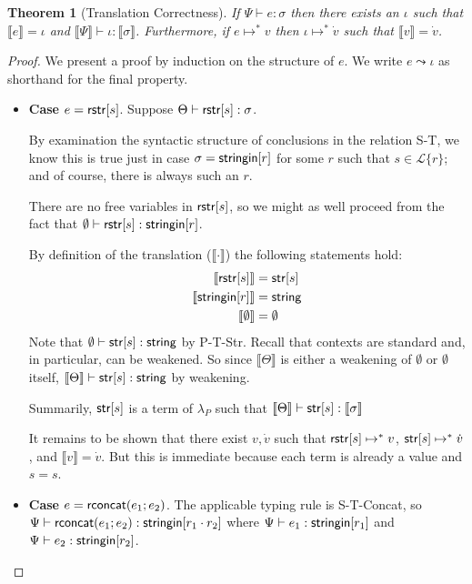 \documentclass[11pt,leqno]{article}
\newtheorem{thm}{Theorem}
\theoremstyle{definition}
\newcommand{\Lagr}{\mathcal{L}}
\newcommand{\lang}[1]{\Lagr\{#1\}}
\newcommand{\lambdap}{\lambda_P}
\newcommand{\stringin}[1]{{\sf stringin}[#1]}
\renewcommand{\tstr}[1]{{{\sf str}[#1]}}
\newcommand{\str}{{\sf string}}
\newcommand{\sctx}{\Psi} %
\newcommand{\tctx}{\Theta} %
\newcommand{\trden}[1]{\llbracket #1 \rrbracket} %
\begin{document}
\begin{thm}[Translation Correctness]\label{thm:trcorrect}
  If $\sctx \vdash e : \sigma$ then 
  there exists an $\iota$ such that $\trden{e} = \iota$
  and $\trden{\sctx} \vdash \iota : \trden{\sigma}$.
  Furthermore, if $e \mapsto^* v$ then
  $\iota \mapsto^* \dot{v}$ such that
  $\trden{v} = \dot{v}$.
\end{thm}
\begin{proof}
We present a proof by induction on the structure of $e$.
We write $e \leadsto \iota$ as shorthand for the final property.

\begin{itemize}[label=$ $, itemsep=1ex]
\item \textbf{Case $e = {\sf rstr}[s]$}. Suppose $\tctx \vdash \rstr{s} : \sigma$.

By examination the syntactic structure of conclusions in the relation S-T, 
we know this is true just in case $\sigma = \stringin{r}$ for some $r$ such that
$s \in \lang{r}$; and of course, there is always such an $r$.

There are no free variables in ${\sf rstr}[s]$, so we might as well proceed from the
fact that $\emptyset \vdash \rstr{s} : \stringin{r}$.

By definition of the translation ($\trden{\cdot}$) the following statements hold:
\begin{align}
\trden{\rstr{s}} &= \tstr{s} \\
\trden{\stringin{r}} &= \str \\
\trden{\emptyset} &= \emptyset
\end{align}
Note that $\emptyset \vdash \tstr{s} : \str$ by P-T-Str.
Recall that contexts are standard and, in particular, can be weakened.
So since $\trden{\tctx}$ is either a weakening of $\emptyset$ or $\emptyset$ itself,
$\trden{\tctx} \vdash \tstr{s} : \str$ by weakening.

Summarily, $\tstr{s}$ is a term of $\lambdap$ such that $\trden{\tctx} \vdash \tstr{s} : \trden{\sigma}$

It remains to be shown that there exist $v, \dot{v}$ such that ${\sf rstr}[s] \mapsto^* v$,
$\tstr{s} \mapsto^* \dot{v}$, and $\trden{v} = \dot{v}$. But this is immediate because
each term is already a value and $s=s$.

\item \textbf{Case $e = {\sf rconcat}(e_1;e_2)$}.
The applicable typing rule is S-T-Concat, so $\sctx \vdash \rconcat{e_1}{e_2} : \stringin{r_1\cdot r_2}$
where $\sctx \vdash e_1 : \stringin{r_1}$ and $\sctx \vdash e_2 : \stringin{r_2}$.


\end{itemize}
\end{proof}
\end{document}
